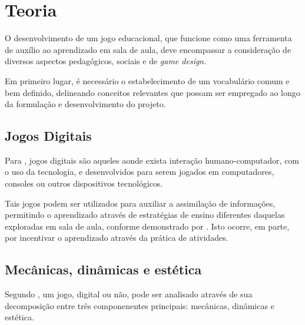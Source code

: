 
\chapter{Teoria}\label{cap-teoria}

O desenvolvimento de um jogo educacional, que funcione como uma ferramenta de auxílio ao aprendizado em sala de aula, deve encompassar a consideração de diversos aspectos pedagógicos, sociais e de \textit{game design}.

Em primeiro lugar, é necessário o estabelecimento de um vocabulário comum e bem definido, delineando conceitos relevantes que possam ser empregado ao longo da formulação e desenvolvimento do projeto.

\section{Jogos Digitais}\label{sec-jogosdigitais}

Para \cite{correia:2009:digital_games_spore}, jogos digitais são aqueles aonde exista interação humano-computador, com o uso da tecnologia, e desenvolvidos para serem jogados em computadores, consoles ou outros dispositivos tecnológicos.

Tais jogos podem ser utilizados para auxiliar a assimilação de informações, permitindo o aprendizado através de estratégias de ensino diferentes daquelas exploradas em sala de aula, conforme demonstrado por \cite{fernandes:2012:digital_education}. Isto ocorre, em parte, por incentivar o aprendizado através da prática de atividades.


\section{Mecânicas, dinâmicas e estética}\label{sec-mecanica-dinamica-estetica}

Segundo \cite{hunicke:2004}, um jogo, digital ou não, pode ser analisado através de sua decomposição entre três componenentes principais: mecânicas, dinâmicas e estética.

